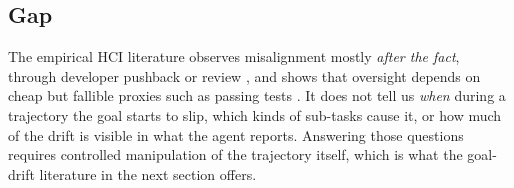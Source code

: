 \subsection{Gap}

The empirical HCI literature observes misalignment mostly \emph{after the fact}, through
developer pushback \citep{tang2026fail} or review \citep{watanabe2025agentic}, and shows that
oversight depends on cheap but fallible proxies such as passing tests
\citep{dhanorkar2026oversight}. It does not tell us \emph{when} during a trajectory the goal starts
to slip, which kinds of sub-tasks cause it, or how much of the drift is visible in what the agent
reports. Answering those questions requires controlled manipulation of the trajectory itself, which is
what the goal-drift literature in the next section offers.
